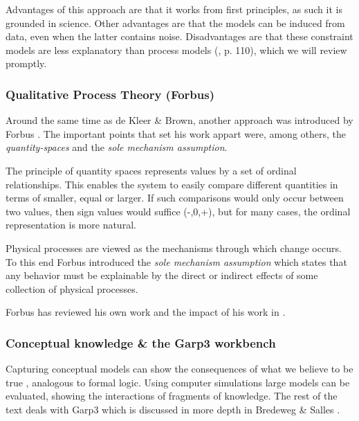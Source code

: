 \documentclass{article} %
\begin{document}
Advantages of this approach are that it works from first principles, as such it
is grounded in science. Other advantages are that the models can be induced
from data, even when the latter contains noise. Disadvantages are that these
constraint models are less explanatory than process models (\cite{forbus}, p.
110), which we will review promptly.

\subsubsection{Qualitative Process Theory (Forbus)}
\label{sec:litrev_qr_forbus}
Around the same time as de Kleer \& Brown, another approach was introduced by
Forbus \cite{forbus}. The important points that set his work appart were,
among others, the \emph{quantity-spaces} and the \emph{sole mechanism
assumption}.

The principle of quantity spaces represents values by a set of ordinal
relationships. This enables the system to easily compare different
quantities in terms of smaller, equal or larger. If such comparisons would
only occur between two values, then sign values would suffice (-,0,+), but for
many cases, the ordinal representation is more natural.

\vspace{0.8em}

Physical processes are viewed as the mechanisms through which change occurs.
To this end Forbus introduced the \emph{sole mechanism assumption} which
states that any behavior must be explainable by the direct or indirect effects
of some collection of physical processes. %

\vspace{0.8em}

Forbus has reviewed his own work and the impact of his work in
\cite{forbus12}.

\subsubsection{Conceptual knowledge \& the Garp3 workbench}
\label{sec:litrev_qr_garp}

Capturing conceptual models can show the consequences of what we believe to be
true \cite{bredeweg-eco}, analogous to formal logic. Using computer simulations
large models can be evaluated, showing the interactions of fragments of
knowledge. The rest of the text \cite{bredeweg-eco} deals with Garp3 which is
discussed in more depth in Bredeweg \& Salles \cite{bredeweg-garp}.
\end{document}
